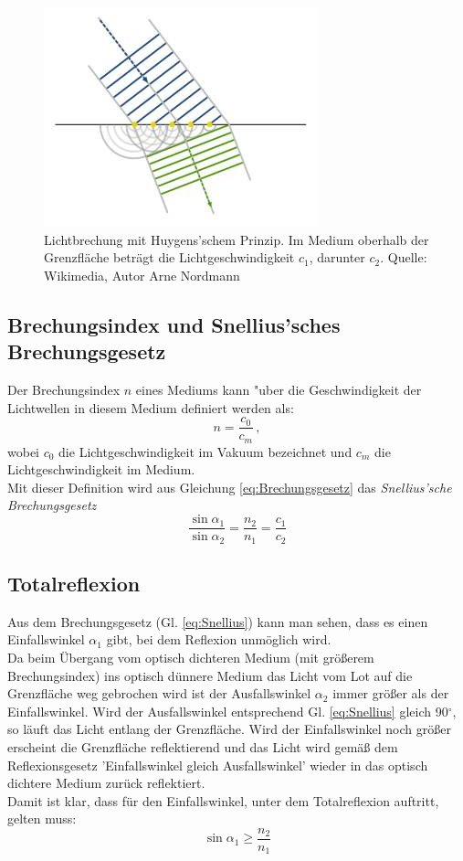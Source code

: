 \begin{figure}[hb]
	\centering
		\includegraphics[width=.5\textwidth]{Versuch_9-10/Abbildungen/Brechung.jpg}
	\caption{Lichtbrechung mit Huygens'schem Prinzip. Im Medium oberhalb der Grenzfläche beträgt die Lichtgeschwindigkeit $c_1$, darunter $c_2$. Quelle: Wikimedia, Autor Arne Nordmann}
	\label{fig:brechung}
\end{figure}

\subsection{Brechungsindex und Snellius'sches Brechungsgesetz}

Der Brechungsindex $n$ eines Mediums kann "uber die Geschwindigkeit der Lichtwellen in diesem Medium definiert werden als:
\begin{equation}
n = \frac{c_0}{c_m}\, ,
\end{equation}
wobei $c_0$ die Lichtgeschwindigkeit im Vakuum bezeichnet und $c_m$ die Lichtgeschwindigkeit im Medium.\\

\noindent
Mit dieser Definition wird aus Gleichung \ref{eq:Brechungsgesetz} das \textit{Snellius'sche Brechungsgesetz}
\begin{equation} \label{eq:Snellius}
\frac{\sin\alpha_1}{\sin\alpha_2} = \frac{n_2}{n_1} = \frac{c_1}{c_2}
\end{equation}

\subsection{Totalreflexion}

Aus dem Brechungsgesetz (Gl. \ref{eq:Snellius}) kann man sehen, dass es einen Einfallswinkel $\alpha_1$ gibt, bei dem Reflexion unmöglich wird.\\
Da beim Übergang vom optisch dichteren Medium (mit größerem Brechungsindex) ins optisch dünnere Medium das Licht vom Lot auf die Grenzfläche weg gebrochen wird ist der Ausfallswinkel $\alpha_2$ immer größer als der Einfallswinkel. Wird der Ausfallswinkel entsprechend Gl. \ref{eq:Snellius} gleich 90$^{\circ}$, so läuft das Licht entlang der Grenzfläche. Wird der Einfallswinkel noch größer erscheint die Grenzfläche reflektierend und das Licht wird gemäß dem Reflexionsgesetz 'Einfallswinkel gleich Ausfallswinkel' wieder in das optisch dichtere Medium zurück reflektiert.\\
Damit ist klar, dass für den Einfallswinkel, unter dem Totalreflexion auftritt, gelten muss:
\begin{equation}
	\sin\alpha_1 \geq \frac{n_2}{n_1}
\end{equation}

